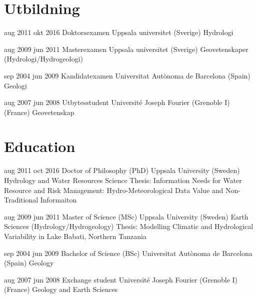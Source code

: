
\ifswedish

    \section{Utbildning}

        \position
            {aug 2011 \textemdash{} okt 2016}
            {Doktorsexamen}
            {Uppsala universitet (Sverige)}
            {Hydrologi}

        \position
            {aug 2009 \textemdash{} jun 2011}
            {Masterexamen}
            {Uppsala universitet (Sverige)}
            {Geovetenskaper (Hydrologi/Hydrogeologi)}

        \position
            {sep 2004 \textemdash{} jun 2009}
            {Kandidatexamen}
            {Universitat Autònoma de Barcelona (Spain)}
            {Geologi}

        \position
            {aug 2007 \textemdash{} jun 2008}
            {Utbytesstudent}
            {Université Joseph Fourier (Grenoble I) (France)}
            {Geovetenskap}

\else

    \section{Education}

        \position
            {aug 2011 \textemdash{} oct 2016}
            {Doctor of Philosophy (PhD)}
            {Uppsala University (Sweden)}
            {Hydrology and Water Resources Science \newline
            Thesis: Information Needs for Water Resource and Risk Management: Hydro-Meteorological Data Value and Non-Traditional Informaiton}

        \position
            {aug 2009 \textemdash{} jun 2011}
            {Master of Science (MSc)}
            {Uppsala University (Sweden)}
            {Earth Sciences (Hydrology/Hydrogeology) \newline
            Thesis: Modelling Climatic and Hydrological Variability in Lake Babati, Northern Tanzania}

        \position
            {sep 2004 \textemdash{} jun 2009}
            {Bachelor of Science (BSc)}
            {Universitat Autònoma de Barcelona (Spain)}
            {Geology}

        \position
            {aug 2007 \textemdash{} jun 2008}
            {Exchange student}
            {Université Joseph Fourier (Grenoble I) (France)}
            {Geology and Earth Sciences}

\fi
